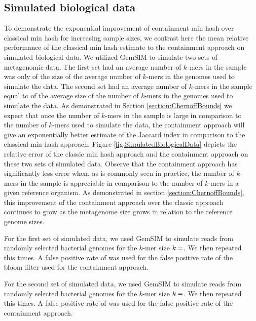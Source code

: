 \documentclass[11pt]{amsart}
\theoremstyle{remark}
\numberwithin{equation}{section}
\newcommand{\themethod}{containment min hash }
\newcommand{\SimulatedBiologicalDataksize}{\protect }
\newcommand{\SimulatedBiologicalDataNumGenomes}{\protect }
\newcommand{\SimulatedBiologicalDataNumReads}{\protect }
\newcommand{\SimulatedBiologicalDataNumReplicates}{\protect }
\newcommand{\SimulatedBiologicalDatap}{\protect }
\newcommand{\SimulatedBiologicalDataSmallKsize}{\protect }
\newcommand{\SimulatedBiologicalDataSmallNumGenomes}{\protect }
\newcommand{\SimulatedBiologicalDataSmallNumReads}{\protect }
\newcommand{\SimulatedBiologicalDataSmallNumReplicates}{\protect }
\newcommand{\SimulatedBiologicalDataSmallP}{\protect }
\newcommand{\SimulatedBiologicalDataSmallRelSize}{\protect }
\begin{document}
\subsection{Simulated biological data}
To demonstrate the exponential improvement of \themethod over classical min hash for increasing sample sizes, we contrast here the mean relative performance of the classical min hash estimate to the containment approach on simulated biological data. We utilized GemSIM \cite{mcelroy2012gemsim} to simulate two sets of metagenomic data. The first set had an average number of $k$-mers in the sample was only \SimulatedBiologicalDataSmallRelSize of the size of the average number of $k$-mers in the genomes used to simulate the data. The second set had an average number of $k$-mers in the sample equal to of the average size of the number of $k$-mers in the genomes used to simulate the data. As demonstrated in Section \ref{section:ChernoffBounds} we expect that once the number of $k$-mers in the sample is large in comparison to the number of $k$-mers used to simulate the data, the containment approach will give an exponentially better estimate of the Jaccard index in comparison to the classical min hash approach. Figure \ref{fig:SimulatedBiologicalData} depicts the relative error of the classic min hash approach and the containment approach on these two sets of simulated data. Observe that the containment approach has significantly less error when, as is commonly seen in practice, the number of $k$-mers in the sample is appreciable in comparison to the number of $k$-mers in a given reference organism. As demonstrated in section \ref{section:ChernoffBounds}, this improvement of the containment approach over the classic approach continues to grow as the metagenome size grows in relation to the reference genome sizes.

For the first set of simulated data, we used GemSIM to simulate \SimulatedBiologicalDataSmallNumReads reads from \SimulatedBiologicalDataSmallNumGenomes randomly selected bacterial genomes for the $k$-mer size $k=\SimulatedBiologicalDataSmallKsize$. We then repeated this \SimulatedBiologicalDataSmallNumReplicates times. A false positive rate of \SimulatedBiologicalDataSmallP was used for the false positive rate of the bloom filter used for the containment approach.

For the second set of simulated data, we used GemSIM to simulate \SimulatedBiologicalDataNumReads reads from \SimulatedBiologicalDataNumGenomes randomly selected bacterial genomes for the $k$-mer size $k=\SimulatedBiologicalDataksize$. We then repeated this \SimulatedBiologicalDataNumReplicates times. A false positive rate of \SimulatedBiologicalDatap was used for the false positive rate of the containment approach.
\end{document}
